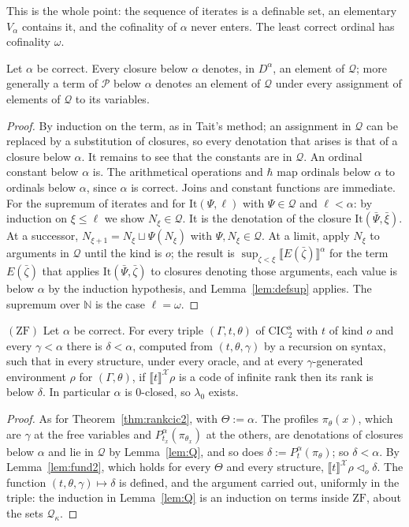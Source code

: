 \documentclass[10pt]{article}
\newcommand{\N}{\mathbb{N}}
\newcommand{\CIC}{\mathrm{CIC}}
\newcommand{\ZF}{\mathrm{ZF}}
\newcommand{\sem}[1]{\llbracket #1\rrbracket}
\newcommand{\X}{\mathcal{X}}
\begin{document}
This is the whole point: the sequence of iterates is a definable set, an
elementary $V_\alpha$ contains it, and the cofinality of $\alpha$ never
enters. The least correct ordinal has cofinality $\omega$.

\begin{lemma}\label{lem:Q}
Let $\alpha$ be correct. Every closure below $\alpha$ denotes, in
$D^\alpha$, an element of $\mathcal Q$; more generally a term of
$\mathcal P$ below $\alpha$ denotes an element of $\mathcal Q$ under every
assignment of elements of $\mathcal Q$ to its variables.
\end{lemma}
\begin{proof}
By induction on the term, as in Tait's method; an assignment in
$\mathcal Q$ can be replaced by a substitution of closures, so every
denotation that arises is that of a closure below $\alpha$. It remains to
see that the constants are in $\mathcal Q$. An ordinal constant below
$\alpha$ is. The arithmetical operations and $\hbar$ map ordinals below
$\alpha$ to ordinals below $\alpha$, since $\alpha$ is correct. Joins and
constant functions are immediate. For the supremum of iterates and for
$\mathrm{It}(\Psi,\ell)$ with $\Psi\in\mathcal Q$ and $\ell<\alpha$: by
induction on $\xi\le\ell$ we show $N_\xi\in\mathcal Q$. It is the
denotation of the closure $\mathrm{It}(\bar\Psi,\bar\xi)$. At a successor,
$N_{\xi+1}=N_\xi\sqcup\Psi(N_\xi)$ with $\Psi,N_\xi\in\mathcal Q$. At a
limit, apply $N_\xi$ to arguments in $\mathcal Q$ until the kind is $o$;
the result is $\sup_{\zeta<\xi}\sem{E(\bar\zeta)}^\alpha$ for the term
$E(\bar\zeta)$ that applies $\mathrm{It}(\bar\Psi,\bar\zeta)$ to closures
denoting those arguments, each value is below $\alpha$ by the induction
hypothesis, and Lemma~\ref{lem:defsup} applies. The supremum over $\N$ is
the case $\ell=\omega$.
\end{proof}

\begin{theorem}\label{thm:cic2}
$(\ZF)$ Let $\alpha$ be correct. For every triple $(\Gamma,t,\theta)$ of
$\CIC_2^{\mathrm s}$ with $t$ of kind $o$ and every $\gamma<\alpha$ there is
$\delta<\alpha$, computed from $(t,\theta,\gamma)$ by a recursion on syntax,
such that in every structure, under every oracle, and at every
$\gamma$-generated environment $\rho$ for $(\Gamma,\theta)$, if
$\sem t^\X\rho$ is a code of infinite rank then its rank is below $\delta$.
In particular $\alpha$ is $0$-closed, so $\lambda_0$ exists.
\end{theorem}
\begin{proof}
As for Theorem~\ref{thm:rankcic2}, with $\Theta:=\alpha$. The profiles
$\pi_\theta(x)$, which are $\hat\gamma$ at the free variables and
$P^\alpha_{t_x}(\pi_{\theta_x})$ at the others, are denotations of closures
below $\alpha$ and lie in $\mathcal Q$ by Lemma~\ref{lem:Q}, and so does
$\delta:=P^\alpha_t(\pi_\theta)$; so $\delta<\alpha$. By
Lemma~\ref{lem:fund2}, which holds for every $\Theta$ and every structure,
$\sem t^\X\rho\lhd_o\delta$. The function $(t,\theta,\gamma)\mapsto\delta$ is
defined, and the argument carried out, uniformly in the triple: the
induction in Lemma~\ref{lem:Q} is an induction on terms inside $\ZF$,
about the sets $\mathcal Q_\kappa$.
\end{proof}
\end{document}
